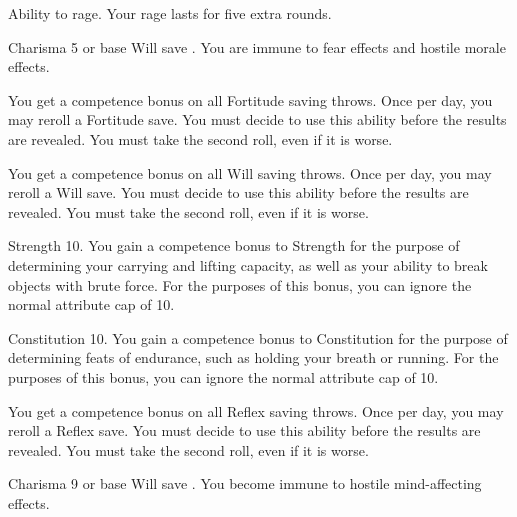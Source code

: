  Ability to rage.
 Your rage lasts for five extra rounds.

\featpre Charisma 5 or base Will save .
\featben You are immune to fear effects and hostile morale effects.

 You get a  competence bonus on all Fortitude saving throws. Once per day, you may reroll a Fortitude save. You must decide to use this ability before the results are revealed. You must take the second roll, even if it is worse.


 You get a  competence bonus on all Will saving throws. Once per day, you may reroll a Will save. You must decide to use this ability before the results are revealed. You must take the second roll, even if it is worse.

\featpre Strength 10.
\featben You gain a  competence bonus to Strength for the purpose of determining your carrying and lifting capacity, as well as your ability to break objects with brute force. For the purposes of this bonus, you can ignore the normal attribute cap of 10.


\featpre Constitution 10.
\featben You gain a  competence bonus to Constitution for the purpose of determining feats of endurance, such as holding your breath or running. For the purposes of this bonus, you can ignore the normal attribute cap of 10.


 You get a  competence bonus on all Reflex saving throws. Once per day, you may reroll a Reflex save. You must decide to use this ability before the results are revealed. You must take the second roll, even if it is worse.

\featpre Charisma 9 or base Will save .
\featben You become immune to hostile mind-affecting effects.

